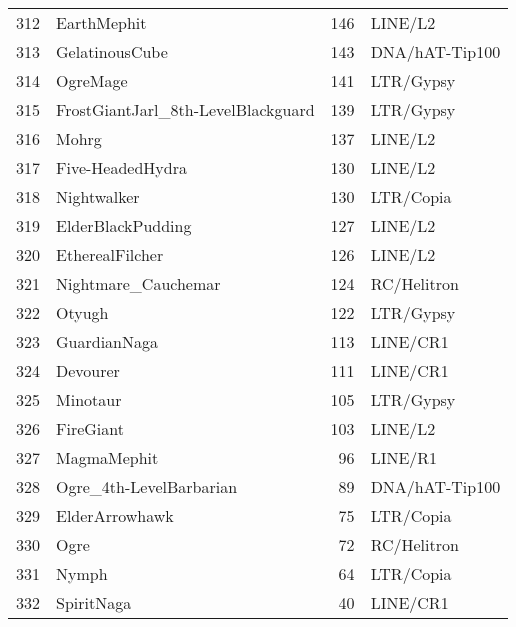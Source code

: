 \begin{table}[ht]
\begin{tabular}{rlrl}
  312 & EarthMephit & 146 & LINE/L2  \\ 
  313 & GelatinousCube & 143 & DNA/hAT-Tip100  \\ 
  314 & OgreMage & 141 & LTR/Gypsy  \\ 
  315 & FrostGiantJarl\_8th-LevelBlackguard & 139 & LTR/Gypsy  \\ 
  316 & Mohrg & 137 & LINE/L2  \\ 
  317 & Five-HeadedHydra & 130 & LINE/L2  \\ 
  318 & Nightwalker & 130 & LTR/Copia  \\ 
  319 & ElderBlackPudding & 127 & LINE/L2  \\ 
  320 & EtherealFilcher & 126 & LINE/L2  \\ 
  321 & Nightmare\_Cauchemar & 124 & RC/Helitron  \\ 
  322 & Otyugh & 122 & LTR/Gypsy  \\ 
  323 & GuardianNaga & 113 & LINE/CR1  \\ 
  324 & Devourer & 111 & LINE/CR1  \\ 
  325 & Minotaur & 105 & LTR/Gypsy  \\ 
  326 & FireGiant & 103 & LINE/L2  \\ 
  327 & MagmaMephit &  96 & LINE/R1  \\ 
  328 & Ogre\_4th-LevelBarbarian &  89 & DNA/hAT-Tip100  \\ 
  329 & ElderArrowhawk &  75 & LTR/Copia  \\ 
  330 & Ogre &  72 & RC/Helitron  \\ 
  331 & Nymph &  64 & LTR/Copia  \\ 
  332 & SpiritNaga &  40 & LINE/CR1  \\ 
   \hline
\end{tabular}
\end{table}
